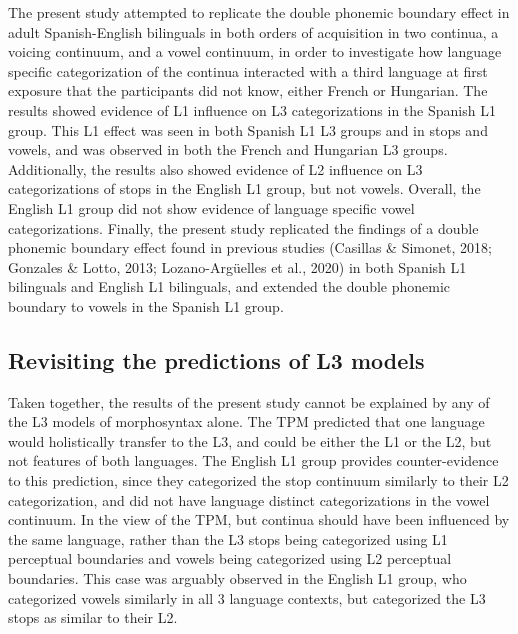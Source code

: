 \documentclass[
  english,
  man]{apa6}
\begin{document}
The present study attempted to replicate the double phonemic boundary effect in adult Spanish-English bilinguals in both orders of acquisition in two continua, a voicing continuum, and a vowel continuum, in order to investigate how language specific categorization of the continua interacted with a third language at first exposure that the participants did not know, either French or Hungarian. The results showed evidence of L1 influence on L3 categorizations in the Spanish L1 group. This L1 effect was seen in both Spanish L1 L3 groups and in stops and vowels, and was observed in both the French and Hungarian L3 groups. Additionally, the results also showed evidence of L2 influence on L3 categorizations of stops in the English L1 group, but not vowels. Overall, the English L1 group did not show evidence of language specific vowel categorizations. Finally, the present study replicated the findings of a double phonemic boundary effect found in previous studies (Casillas \& Simonet, 2018; Gonzales \& Lotto, 2013; Lozano-Argüelles et al., 2020) in both Spanish L1 bilinguals and English L1 bilinguals, and extended the double phonemic boundary to vowels in the Spanish L1 group.

\hypertarget{revisiting-the-predictions-of-l3-models}{%
\subsection{Revisiting the predictions of L3 models}\label{revisiting-the-predictions-of-l3-models}}

Taken together, the results of the present study cannot be explained by any of the L3 models of morphosyntax alone. The TPM predicted that one language would holistically transfer to the L3, and could be either the L1 or the L2, but not features of both languages.
The English L1 group provides counter-evidence to this prediction, since they categorized the stop continuum similarly to their L2 categorization, and did not have language distinct categorizations in the vowel continuum. In the view of the TPM, but continua should have been influenced by the same language, rather than the L3 stops being categorized using L1 perceptual boundaries and vowels being categorized using L2 perceptual boundaries. This case was arguably observed in the English L1 group, who categorized vowels similarly in all 3 language contexts, but categorized the L3 stops as similar to their L2.
\end{document}
